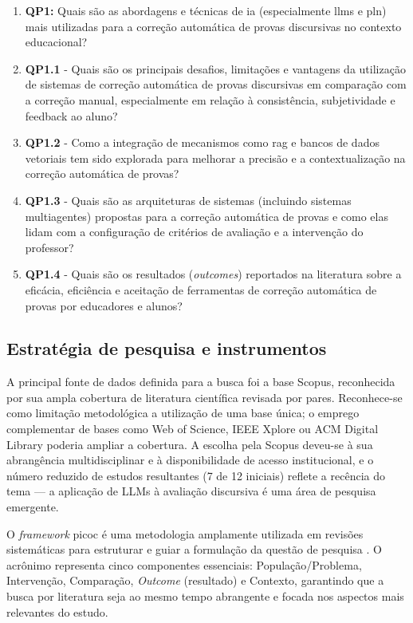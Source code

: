 \begin{enumerate}
    \item \textbf{QP1:} Quais são as abordagens e técnicas de \gls{ia} (especialmente \gls{llm}s e \gls{pln}) mais utilizadas para a correção automática de provas discursivas no contexto educacional?

    \item \textbf{QP1.1} - Quais são os principais desafios, limitações e vantagens da utilização de sistemas de correção automática de provas discursivas em comparação com a correção manual, especialmente em relação à consistência, subjetividade e feedback ao aluno?

    \item \textbf{QP1.2} - Como a integração de mecanismos como \gls{rag} e bancos de dados vetoriais tem sido explorada para melhorar a precisão e a contextualização na correção automática de provas?

    \item \textbf{QP1.3} - Quais são as arquiteturas de sistemas (incluindo sistemas multiagentes) propostas para a correção automática de provas e como elas lidam com a configuração de critérios de avaliação e a intervenção do professor?

    \item \textbf{QP1.4} - Quais são os resultados (\textit{outcomes}) reportados na literatura sobre a eficácia, eficiência e aceitação de ferramentas de correção automática de provas por educadores e alunos?
\end{enumerate}

\subsection{Estratégia de pesquisa e instrumentos}

A principal fonte de dados definida para a busca foi a base Scopus, reconhecida por sua ampla cobertura de literatura científica revisada por pares. Reconhece-se como limitação metodológica a utilização de uma base única; o emprego complementar de bases como Web of Science, IEEE Xplore ou ACM Digital Library poderia ampliar a cobertura. A escolha pela Scopus deveu-se à sua abrangência multidisciplinar e à disponibilidade de acesso institucional, e o número reduzido de estudos resultantes (7 de 12 iniciais) reflete a recência do tema --- a aplicação de LLMs à avaliação discursiva é uma área de pesquisa emergente.

O \textit{framework} \gls{picoc} é uma metodologia amplamente utilizada em revisões sistemáticas para estruturar e guiar a formulação da questão de pesquisa \cite{kitchenham_guidelines_2007}. O acrônimo representa cinco componentes essenciais: População/Problema, Intervenção, Comparação, \textit{Outcome} (resultado) e Contexto, garantindo que a busca por literatura seja ao mesmo tempo abrangente e focada nos aspectos mais relevantes do estudo.

